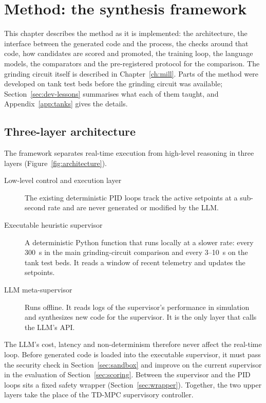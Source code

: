 \chapter{Method: the synthesis framework}
\label{ch:method}
This chapter describes the method as it is implemented: the architecture, the
interface between the generated code and the process, the checks around that
code, how candidates are scored and promoted, the training loop, the language
models, the comparators and the pre-registered protocol for the comparison.
The grinding circuit itself is described in Chapter~\ref{ch:mill}. Parts
of the method were developed on tank test beds before the grinding circuit was
available; Section~\ref{sec:dev-lessons} summarises what each of them taught,
and Appendix~\ref{app:tanks} gives the details.

\section{Three-layer architecture}
\label{sec:architecture}
The framework separates real-time execution from high-level reasoning in
three layers (Figure~\ref{fig:architecture}).
\begin{description}
\item[Low-level control and execution layer] The existing deterministic PID
  loops track the active setpoints at a sub-second rate and are never
  generated or modified by the LLM.
\item[Executable heuristic supervisor] A deterministic Python function that
  runs locally at a slower rate: every 300~s in the main grinding-circuit
  comparison and every 3--10~s on the tank test beds. It reads a window of
  recent telemetry and updates the setpoints.
\item[LLM meta-supervisor] Runs offline. It reads logs of the supervisor's
  performance in simulation and synthesizes new code for the supervisor. It
  is the only layer that calls the LLM's API.
\end{description}
The LLM's cost, latency and non-determinism therefore never affect the
real-time loop. Before generated code is loaded into the executable
supervisor, it must pass the security check in Section~\ref{sec:sandbox} and
improve on the current supervisor in the evaluation of
Section~\ref{sec:scoring}. Between the supervisor and the PID loops sits a
fixed safety wrapper (Section~\ref{sec:wrapper}). Together, the two upper
layers take the place of the TD-MPC supervisory controller.

